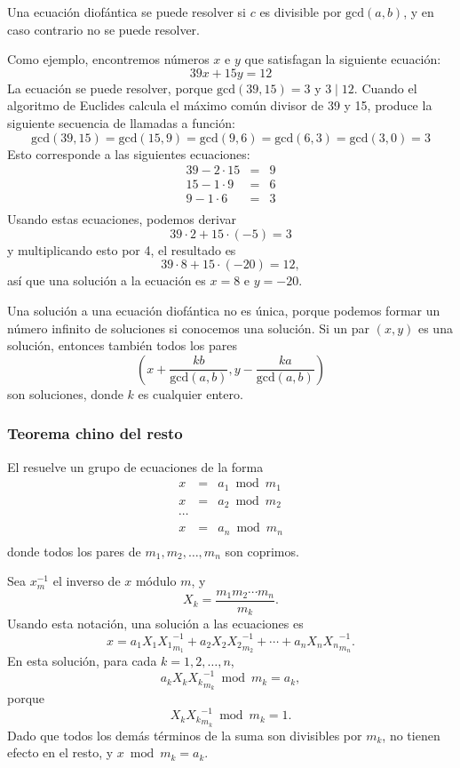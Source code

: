 Una ecuación diofántica se puede resolver si
$c$ es divisible por
$\textrm{gcd}(a,b)$,
y en caso contrario no se puede resolver.

Como ejemplo, encontremos números $x$ e $y$
que satisfagan la siguiente ecuación:
\[
39x + 15y = 12
\]
La ecuación se puede resolver, porque
$\textrm{gcd}(39,15)=3$ y $3 \mid 12$.
Cuando el algoritmo de Euclides calcula el
máximo común divisor de 39 y 15,
produce la siguiente secuencia de llamadas a función:
\[
\textrm{gcd}(39,15) = \textrm{gcd}(15,9)
= \textrm{gcd}(9,6) = \textrm{gcd}(6,3)
= \textrm{gcd}(3,0) = 3 \]
Esto corresponde a las siguientes ecuaciones:
\[
\begin{array}{lcl}
39 - 2 \cdot 15 & = & 9 \\
15 - 1 \cdot 9 & = & 6 \\
9 - 1 \cdot 6 & = & 3 \\
\end{array}
\]
Usando estas ecuaciones, podemos derivar
\[
39 \cdot 2 + 15 \cdot (-5) = 3
\]
y multiplicando esto por 4, el resultado es
\[
39 \cdot 8 + 15 \cdot (-20) = 12,
\]
así que una solución a la ecuación es
$x=8$ e $y=-20$.

Una solución a una ecuación diofántica no es única,
porque podemos formar un número infinito de soluciones
si conocemos una solución.
Si un par $(x,y)$ es una solución, entonces también todos los pares
\[(x+\frac{kb}{\textrm{gcd}(a,b)},y-\frac{ka}{\textrm{gcd}(a,b)})\]
son soluciones, donde $k$ es cualquier entero.

\subsubsection{Teorema chino del resto}


El  resuelve
un grupo de ecuaciones de la forma
\[
\begin{array}{lcl}
x & = & a_1 \bmod m_1 \\
x & = & a_2 \bmod m_2 \\
\cdots \\
x & = & a_n \bmod m_n \\
\end{array}
\]
donde todos los pares de $m_1,m_2,\ldots,m_n$ son coprimos.

Sea $x^{-1}_m$ el inverso de $x$ módulo $m$, y
\[ X_k = \frac{m_1 m_2 \cdots m_n}{m_k}.\]
Usando esta notación, una solución a las ecuaciones es
\[x = a_1 X_1 {X_1}^{-1}_{m_1} + a_2 X_2 {X_2}^{-1}_{m_2} + \cdots + a_n X_n {X_n}^{-1}_{m_n}.\]
En esta solución, para cada $k=1,2,\ldots,n$,
\[a_k X_k {X_k}^{-1}_{m_k} \bmod m_k = a_k,\]
porque
\[X_k {X_k}^{-1}_{m_k} \bmod m_k = 1.\]
Dado que todos los demás términos de la suma son divisibles por $m_k$,
no tienen efecto en el resto,
y $x \bmod m_k = a_k$.

